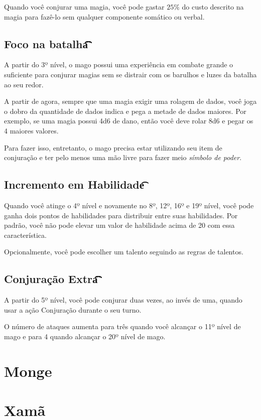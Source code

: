\documentclass{RPG_Adventure}[2021/10/20]
\begin{document}
Quando você conjurar uma magia, você pode gastar $25\%$ do custo descrito na
magia para fazê-lo sem qualquer componente somático ou verbal.

\section*{Foco na batalha\t\t\t\t\t\t\t\t}%
\label{sec:foco_na_batalha}

A partir do 3º nível, o mago possui uma experiência em combate grande o
suficiente para conjurar magias sem se distrair com os barulhos e luzes da
batalha ao seu redor.

A partir de agora, sempre que uma magia exigir uma rolagem de dados, você joga o
dobro da quantidade de dados indica e pega a metade de dados maiores. Por
exemplo, se uma magia possui 4d6 de dano, então você deve rolar 8d6 e pegar os
4 maiores valores.

Para fazer isso, entretanto, o mago precisa estar utilizando seu item de
conjuração e ter pelo menos uma mão livre para fazer meio \textit{símbolo de
poder}.

\section*{Incremento em Habilidade\t\t}%
\label{sec:incremento_em_habilidade}

Quando você atinge o 4º nível e novamente no 8º, 12º, 16º e 19º nível, você pode
ganha dois pontos de habilidades para distribuir entre suas habilidades. Por
padrão, você não pode elevar um valor de habilidade acima de 20 com essa
característica.

Opcionalmente, você pode escolher um talento seguindo as regras de talentos.

\section*{Conjuração Extra\t\t\t\t\t\t\t}%
\label{sec:conjuraçao_extra}

A partir do 5º nível, você pode conjurar duas vezes, ao invés de uma, quando
usar a ação Conjuração durante o seu turno.

O número de ataques aumenta para três quando você alcançar o 11º nível de
mago e para 4 quando alcançar o 20º nível de mago.


\chapter{Monge}%
\label{cha:monge}


\chapter{Xamã}%
\label{cha:xama}
\end{document}
